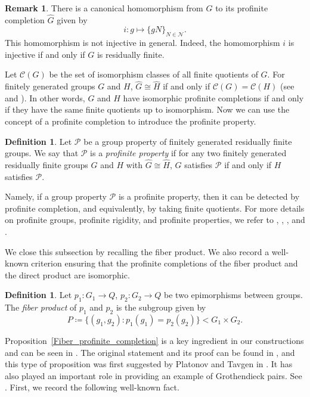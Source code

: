 \documentclass[11pt]{amsart}
\theoremstyle{definition}
\newtheorem{defn}[thm]{Definition}
\newtheorem{rmk}[thm]{Remark}
\begin{document}
\begin{rmk}
 There is a canonical homomorphism from $G$ to its profinite completion $\widehat{G}$ given by \[ i : g \mapsto \{ gN \}_{N \in \mathcal{N}}. \]
This homomorphism is not injective in general. Indeed, the homomorphism $i$ is injective if and only if $G$ is residually finite.
\end{rmk}

Let $\mathcal{C}(G)$ be the set of isomorphism classes of all finite quotients of $G$.
For finitely generated groups $G$ and $H$, $\widehat{G} \cong \widehat{H}$ if and only if $\mathcal{C}(G) = \mathcal{C}(H)$ (see \cite{dixon1982profinite} and \cite{nikolov2007finitely}).
In other words, $G$ and $H$ have isomorphic profinite completions if and only if they have the same finite quotients up to isomorphism.
Now we can use the concept of a profinite completion to introduce the profinite property.

\begin{defn}
 Let $\mathcal{P}$ be a group property of finitely generated residually finite groups. We say that $\mathcal{P}$ is a \emph{profinite property} if for any two finitely generated residually finite groups $G$ and $H$ with $\widehat{G} \cong \widehat{H}$, $G$ satisfies $\mathcal{P}$ if and only if $H$ satisfies $\mathcal{P}$.
\end{defn}

Namely, if a group property $\mathcal{P}$ is a profinite property, then it can be detected by profinite completion, and equivalently, by taking finite quotients.
For more details on profinite groups, profinite rigidity, and profinite properties, 
we refer to \cite{nikolov2007finitely}, \cite{MR2599132}, \cite{reid2018profinite}, and \cite{bridson2026chasing}.

We close this subsection by recalling the fiber product.
We also record a well-known criterion ensuring that the profinite completions of the fiber product and the direct product are isomorphic.

\begin{defn}\label{def:fiberproduct}
 Let $p_1 \colon G_1 \to Q$, $p_2\colon G_2 \to Q$ be two epimorphisms between groups. The \emph{fiber product} of $p_1$ and $p_2$ is the subgroup given by
 $$ P\coloneqq \{ (g_1,g_2) : p_1(g_1)=p_2(g_2) \} < G_1 \times G_2 . $$
\end{defn}

 Proposition~\ref{Fiber_profinite_completion} is a key ingredient in our constructions and can be seen in \cite[Proposition 1.2]{bridson2024profinite}.
 The original statement and its proof can be found in \cite[Theorem 2.2]{MR3531665}, and this type of proposition was first suggested by Platonov and Tavgen in \cite{platonov1986grothendieck}.
 It has also played an important role in providing an example of Grothendieck pairs. See \cite{MR2119723}.
 First, we record the following well-known fact.
\end{document}
